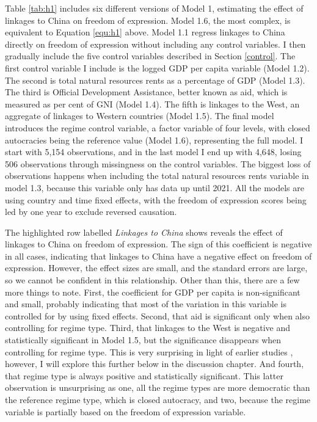 Table \ref{tab:h1} includes six different versions of Model 1, estimating the effect of linkages to China on freedom of expression. Model 1.6, the most complex, is equivalent to Equation \ref{equ:h1} above. Model 1.1 regress linkages to China directly on freedom of expression without including any control variables. I then gradually include the five control variables described in Section \ref{control}. The first control variable I include is the logged GDP per capita variable (Model 1.2). The second is total natural resources rents as a percentage of GDP (Model 1.3). The third is Official Development Assistance, better known as aid, which is measured as per cent of GNI (Model 1.4). The fifth is linkages to the West, an aggregate of linkages to Western countries (Model 1.5). The final model introduces the regime control variable, a factor variable of four levels, with closed autocracies being the reference value (Model 1.6), representing the full model. I start with 5,154 observations, and in the last model I end up with 4,648, losing 506 observations through missingness on the control variables. The biggest loss of observations happens when including the total natural resources rents variable in model 1.3, because this variable only has data up until 2021. All the models are using country and time fixed effects, with the freedom of expression scores being led by one year to exclude reversed causation. 

The highlighted row labelled \textit{Linkages to China} shows reveals the effect of linkages to China on freedom of expression. The sign of this coefficient is negative in all cases, indicating that linkages to China have a negative effect on freedom of expression. However, the effect sizes are small, and the standard errors are large, so we cannot be confident in this relationship. Other than this, there are a few more things to note. First, the coefficient for GDP per capita is non-significant and small, probably indicating that most of the variation in this variable is controlled for by using fixed effects. Second, that aid is significant only when also controlling for regime type. Third, that linkages to the West is negative and statistically significant in Model 1.5, but the significance disappears when controlling for regime type. This is very surprising in light of earlier studies \citep{levitsky_linkage_2006}, however, I will explore this further below in the discussion chapter. And fourth, that regime type is always positive and statistically significant. This latter observation is unsurprising as one, all the regime types are more democratic than the reference regime type, which is closed autocracy, and two, because the regime variable is partially based on the freedom of expression variable.

